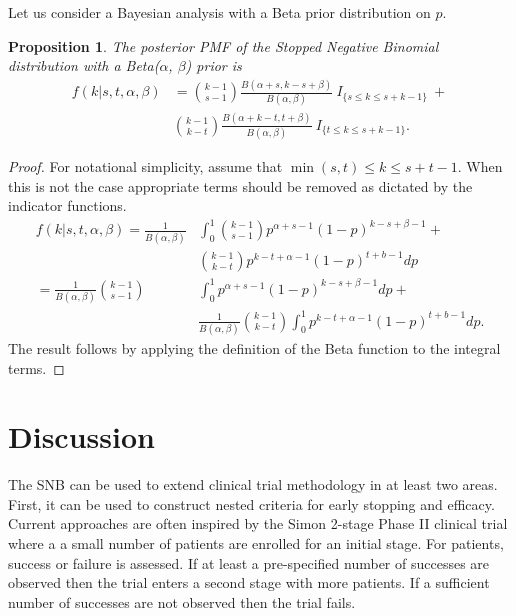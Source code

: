 \documentclass[review]{elsarticle}
\newtheorem{prop}{Proposition}
\begin{document}
Let us consider a Bayesian analysis with a Beta prior distribution on $p$.
\begin{prop} \label{prop:bayesian}
The posterior PMF of the Stopped Negative Binomial distribution with a 
Beta($\alpha$, $\beta$) prior is
\begin{align} \label{eqn:posterior}
f(k | s, t, \alpha, \beta) &= 
  {k-1 \choose s-1} \frac{B\left(\alpha+s, k-s+\beta \right)}{B(\alpha, \beta)} 
    \ I_{\{s \leq k \leq s+k-1\}} \ + \nonumber \\
  & {k-1 \choose k-t} 
    \frac{B\left(\alpha + k - t, t+\beta\right)}{B(\alpha, \beta)} 
    \ I_{\{t \leq k \leq s+k-1\}}.
\end{align}
\end{prop}
\begin{proof}
For notational simplicity, assume that $\min(s,t) \leq k \leq s+t-1$. When 
this is not the case appropriate terms should be removed as dictated by the indicator functions.
\begin{align*}
f(k | s, t, \alpha, \beta) = \frac{1}{B(\alpha, \beta)} & \int_0^1 {k-1 \choose s-1} p^{\alpha +s -1} \left(1-p\right)^{k-s+\beta-1} + \\
 & {k-1 \choose k-t} p^{k-t+\alpha-1}\left(1-p\right)^{t+b-1} dp \\
= \frac{1}{B(\alpha, \beta)}  {k-1 \choose s-1} & \int_0^1  p^{\alpha +s -1} \left(1-p\right)^{k-s+\beta-1} dp + \\
 & \frac{1}{B(\alpha, \beta)} {k-1 \choose k-t} \int_0^1  p^{k-t+\alpha-1}\left(1-p\right)^{t+b-1} dp.
\end{align*}
The result follows by applying the definition of the Beta function to the integral terms.
\end{proof}

\section{Discussion}

The SNB can be used to extend clinical trial methodology
in at least two areas. First, it can be used to construct nested criteria
for early stopping and efficacy. Current approaches are often inspired by
the Simon 2-stage Phase II clinical trial \cite{Simon1989} where a
a small number of patients are enrolled for an initial stage. For patients,
success or failure is assessed. If at least a pre-specified number of
successes are observed then the trial enters a second stage with more
patients. If a sufficient number of successes are not observed then the
trial fails. 
\end{document}
